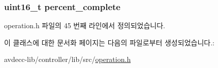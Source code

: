 \subsubsection[{\texorpdfstring{percent\+\_\+complete}{percent_complete}}]{\setlength{\rightskip}{0pt plus 5cm}uint16\+\_\+t percent\+\_\+complete}\hypertarget{classavdecc__lib_1_1operation_aecd19b49efe60de843635a9ab3ac6dd7}{}\label{classavdecc__lib_1_1operation_aecd19b49efe60de843635a9ab3ac6dd7}


operation.\+h 파일의 45 번째 라인에서 정의되었습니다.



이 클래스에 대한 문서화 페이지는 다음의 파일로부터 생성되었습니다.\+:\begin{DoxyCompactItemize}
\item 
avdecc-\/lib/controller/lib/src/\hyperlink{operation_8h}{operation.\+h}\end{DoxyCompactItemize}
